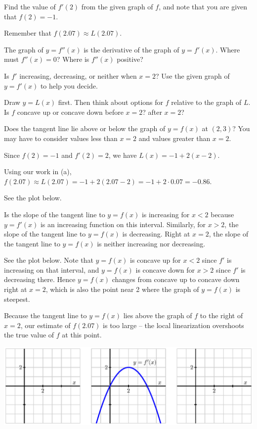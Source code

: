 \begin{bighint}
\ba
	\item Find the value of $f'(2)$ from the given graph of $f$, and note that you are given that $f(2) = -1$.
	\item Remember that $f(2.07) \approx L(2.07)$.
	\item The graph of $y = f''(x)$ is the derivative of the graph of $y = f'(x)$.  Where must $f''(x) = 0$?  Where is $f''(x)$ positive?
	\item Is $f'$ increasing, decreasing, or neither when $x = 2$?  Use the given graph of $y = f'(x)$ to help you decide.
	\item Draw $y = L(x)$ first.  Then think about options for $f$ relative to the graph of $L$.  Is $f$ concave up or concave down before $x = 2$?  after $x = 2$?
	\item Does the tangent line lie above or below the graph of $y = f(x)$ at $(2,3)$?  You may have to consider values less than $x = 2$ and values greater than $x = 2$.
\ea
\end{bighint}
\begin{activitySolution}
\ba
	\item Since $f(2) = -1$ and $f'(2) = 2$, we have $L(x) = -1 + 2(x-2)$.
	\item Using our work in (a), $f(2.07) \approx L(2.07) = -1 + 2(2.07-2) = -1 + 2\cdot 0.07 = -0.86$.  
	\item See the plot below.
	\item Is the slope of the tangent line to $y = f(x)$ is increasing for $x < 2$ because $y = f'(x)$ is an increasing function on this interval.  Similarly, for $x > 2$, the slope of the tangent line to $y = f(x)$ is decreasing.  Right at $x = 2$, the slope of the tangent line to $y = f(x)$ is neither increasing nor decreasing.
	\item See the plot below.  Note that $y = f(x)$ is concave up for $x < 2$ since $f'$ is increasing on that interval, and $y = f(x)$ is concave down for $x > 2$ since $f'$ is decreasing there.  Hence $y = f(x)$ changes from concave up to concave down right at $x = 2$, which is also the point near 2 where the graph of $y = f(x)$ is steepest.
	\item Because the tangent line to $y = f(x)$ lies above the graph  of $f$ to the right of $x = 2$, our estimate of $f(2.07)$ is too large -- the local linearization overshoots the true value of $f$ at this point.
\ea

\begin{center}
\includegraphics{figures/1_8_Act2.eps}
\end{center}
\end{activitySolution}
\aftera